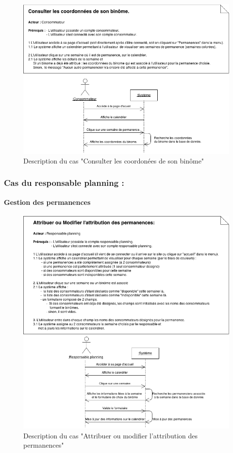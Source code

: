 \documentclass[12pt]{report}
\begin{document}
\begin{figure}[!H]
\centering
\includegraphics[width=1.\textwidth]{./ressources/desc_UC_coo_binome.png}
\caption{Description du cas "Consulter les coordonées de son binôme"}
\end{figure}
\clearpage

\subsubsection{Cas du responsable planning :}
\paragraph*{Gestion des permanences}
\begin{figure}[!Hb]
\centering
\includegraphics[width=1.\textwidth]{./ressources/desc_UC_attribuer_permanences.png}
\caption{Description du cas "Attribuer ou modifier l'attribution des permanences"}
\vspace{20mm}
\end{figure}
\clearpage
\end{document}
